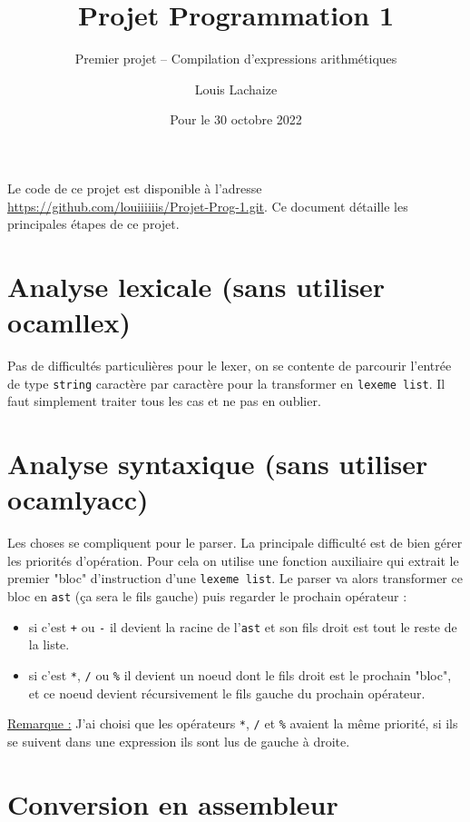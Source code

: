 \documentclass{scrartcl}
\title{Projet Programmation 1}
\subtitle{Premier projet – Compilation d’expressions arithmétiques}
\author{Louis Lachaize}
\date{Pour le 30 octobre 2022}
\begin{document}
\maketitle

Le code de ce projet est disponible à l'adresse \url{https://github.com/louiiiiiis/Projet-Prog-1.git}. Ce document détaille les principales étapes de ce projet.



\section{Analyse lexicale (sans utiliser ocamllex)}

Pas de difficultés particulières pour le lexer, on se contente de parcourir l'entrée de type \texttt{string} caractère par caractère pour la transformer en \texttt{lexeme list}. Il faut simplement traiter tous les cas et ne pas en oublier.



\section{Analyse syntaxique (sans utiliser ocamlyacc)}

Les choses se compliquent pour le parser. La principale difficulté est de bien gérer les priorités d'opération. Pour cela on utilise une fonction auxiliaire qui extrait le premier "bloc" d'instruction d'une \texttt{lexeme list}. Le parser va alors transformer ce bloc en \texttt{ast} (ça sera le fils gauche) puis regarder le prochain opérateur :
\begin{itemize}
    \item si c'est \texttt{+} ou \texttt{-} il devient la racine de l'\texttt{ast} et son fils droit est tout le reste de la liste.
    \item si c'est \texttt{*}, \texttt{/} ou \texttt{\%} il devient un noeud dont le fils droit est le prochain "bloc", et ce noeud devient récursivement le fils gauche du prochain opérateur.
\end{itemize}
\underline{Remarque :} J'ai choisi que les opérateurs \texttt{*}, \texttt{/} et \texttt{\%} avaient la même priorité, si ils se suivent dans une expression ils sont lus de gauche à droite.



\section{Conversion en assembleur}
\end{document}
